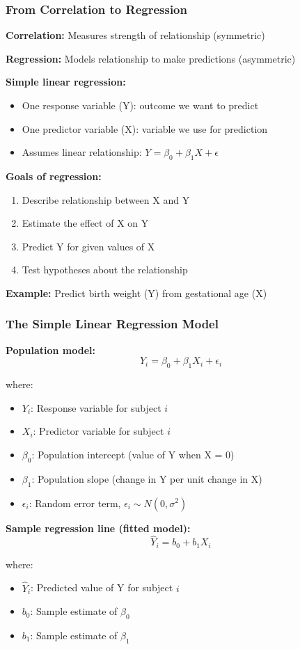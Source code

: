\documentclass{beamer}
\begin{document}
\begin{frame}
\frametitle{From Correlation to Regression}
\textbf{Correlation:} Measures strength of relationship (symmetric)

\vspace{0.3cm}
\textbf{Regression:} Models relationship to make predictions (asymmetric)

\vspace{0.5cm}
\textbf{Simple linear regression:}
\begin{itemize}
\item One response variable (Y): outcome we want to predict
\item One predictor variable (X): variable we use for prediction
\item Assumes linear relationship: $Y = \beta_0 + \beta_1 X + \epsilon$
\end{itemize}

\vspace{0.5cm}
\textbf{Goals of regression:}
\begin{enumerate}
\item Describe relationship between X and Y
\item Estimate the effect of X on Y
\item Predict Y for given values of X
\item Test hypotheses about the relationship
\end{enumerate}

\vspace{0.3cm}
\textbf{Example:} Predict birth weight (Y) from gestational age (X)
\end{frame}

\begin{frame}
\frametitle{The Simple Linear Regression Model}
\textbf{Population model:}
$$Y_i = \beta_0 + \beta_1 X_i + \epsilon_i$$

where:
\begin{itemize}
\item $Y_i$: Response variable for subject $i$
\item $X_i$: Predictor variable for subject $i$
\item $\beta_0$: Population intercept (value of Y when X = 0)
\item $\beta_1$: Population slope (change in Y per unit change in X)
\item $\epsilon_i$: Random error term, $\epsilon_i \sim N(0, \sigma^2)$
\end{itemize}

\vspace{0.5cm}
\textbf{Sample regression line (fitted model):}
$$\hat{Y}_i = b_0 + b_1 X_i$$

where:
\begin{itemize}
\item $\hat{Y}_i$: Predicted value of Y for subject $i$
\item $b_0$: Sample estimate of $\beta_0$
\item $b_1$: Sample estimate of $\beta_1$
\end{itemize}
\end{frame}
\end{document}

